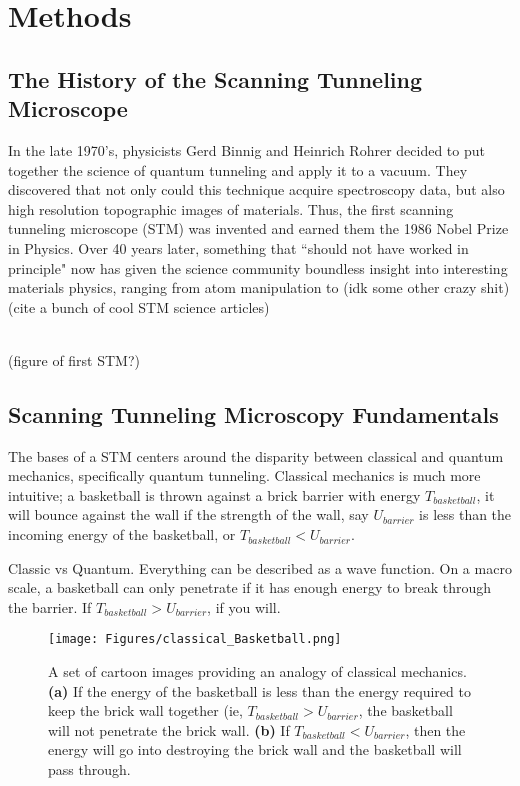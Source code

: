 \chapter{Methods}
\label{ch:Methods}


\section{The History of the Scanning Tunneling Microscope}
In the late 1970's, physicists Gerd Binnig and Heinrich Rohrer decided to put together the science of quantum tunneling and apply it to a vacuum. \cite{binnig-1981-tunneling} They discovered that not only could this technique acquire spectroscopy data, but also high resolution topographic images of materials. Thus, the first scanning tunneling microscope (STM) was invented and earned them the 1986 Nobel Prize in Physics. \cite{binnig-1982-stm, binnig-1987-stm} Over 40 years later, something that ``should not have worked in principle" now has given the science community boundless insight into interesting materials physics, ranging from atom manipulation to (idk some other crazy shit) \cite{binnig-1987-stm} (cite a bunch of cool STM science articles)


\\
(figure of first STM?)
\\

\section{Scanning Tunneling Microscopy Fundamentals}
The bases of a STM centers around the disparity between classical and quantum mechanics, specifically quantum tunneling. Classical mechanics is much more intuitive; a basketball is thrown against a brick barrier with energy $T_{basketball}$, it will bounce against the wall if the strength of the wall, say $U_{barrier}$ is less than the incoming energy of the basketball, or $T_{basketball} < U_{barrier}$.


Classic vs Quantum. Everything can be described as a wave function. On a macro scale, a basketball can only penetrate if it has enough energy to break through the barrier. If $T_{basketball} > U_{barrier}$, if you will.

    \begin{figure}[!h]
        \centering
        \texttt{[image: Figures/classical\_Basketball.png]}
        \caption{A set of cartoon images providing an analogy of classical mechanics. \textbf{(a)} If the energy of the basketball is less than the energy required to keep the brick wall together (ie, $T_{basketball} > U_{barrier}$, the basketball will not penetrate the brick wall.  \textbf{(b)} If $T_{basketball} < U_{barrier}$, then the energy will go into destroying the brick wall and the basketball will pass through.}
        \label{fig:classicBasket}
    \end{figure}


